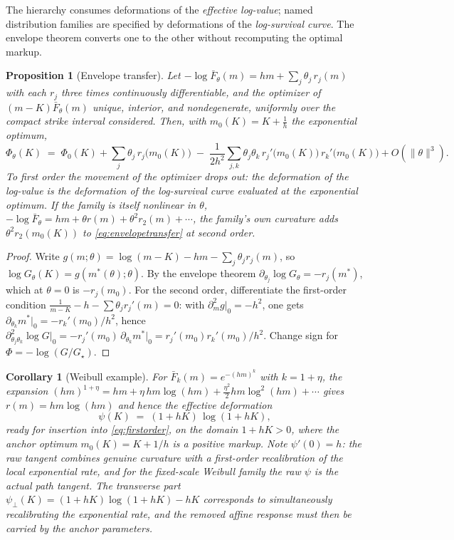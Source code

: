 \documentclass[11pt]{article}
\newtheorem{proposition}{Proposition}
\newtheorem{corollary}{Corollary}
\newcommand{\Fbar}{\bar F}
\begin{document}
The hierarchy consumes deformations of the \emph{effective log-value}; named distribution families are specified by deformations of the \emph{log-survival curve}. The envelope theorem converts one to the other without recomputing the optimal markup.

\begin{proposition}[Envelope transfer]\label{prop:envelope}
Let $-\log \Fbar_\theta(m) = hm + \sum_j \theta_j\, r_j(m)$ with each $r_j$ three times continuously differentiable, and the optimizer of $(m-K)\Fbar_\theta(m)$ unique, interior, and nondegenerate, uniformly over the compact strike interval considered. Then, with $m_0(K) = K + \tfrac1h$ the exponential optimum,
\begin{equation}
\Phi_\theta(K) \;=\; \Phi_0(K) + \sum_j \theta_j\, r_j\big(m_0(K)\big)
\;-\; \frac{1}{2h^2}\sum_{j,k}\theta_j\theta_k\, r_j'\big(m_0(K)\big)\, r_k'\big(m_0(K)\big) + O(\|\theta\|^3).
\label{eq:envelopetransfer}
\end{equation}
To first order the movement of the optimizer drops out: the deformation of the log-value is the deformation of the log-survival curve evaluated at the exponential optimum. If the family is itself nonlinear in $\theta$, $-\log\Fbar_\theta = hm + \theta r(m) + \theta^2 r_2(m) + \cdots$, the family's own curvature adds $\theta^2 r_2(m_0(K))$ to \eqref{eq:envelopetransfer} at second order.
\end{proposition}

\begin{proof}
Write $g(m;\theta) = \log(m-K) - hm - \sum_j\theta_j r_j(m)$, so $\log G_\theta(K) = g(m^\ast(\theta);\theta)$. By the envelope theorem $\partial_{\theta_j}\log G_\theta = -r_j(m^\ast)$, which at $\theta = 0$ is $-r_j(m_0)$. For the second order, differentiate the first-order condition $\tfrac{1}{m-K} - h - \sum\theta_j r_j'(m) = 0$: with $\partial^2_m g\big|_0 = -h^2$, one gets $\partial_{\theta_k} m^\ast\big|_0 = -r_k'(m_0)/h^2$, hence $\partial^2_{\theta_j\theta_k}\log G\big|_0 = -r_j'(m_0)\,\partial_{\theta_k}m^\ast\big|_0 = r_j'(m_0) r_k'(m_0)/h^2$. Change sign for $\Phi = -\log(G/G_\star)$.
\end{proof}

\begin{corollary}[Weibull example]\label{cor:weibull}
For $\Fbar_k(m) = e^{-(hm)^k}$ with $k = 1 + \eta$, the expansion $(hm)^{1+\eta} = hm + \eta\, hm\log(hm) + \tfrac{\eta^2}{2} hm \log^2(hm) + \cdots$ gives $r(m) = hm\log(hm)$ and hence the effective deformation
\[
\psi(K) \;=\; (1 + hK)\,\log(1 + hK),
\]
ready for insertion into \eqref{eq:firstorder}, on the domain $1 + hK > 0$, where the anchor optimum $m_0(K) = K + 1/h$ is a positive markup. Note $\psi'(0) = h$: the raw tangent combines genuine curvature with a first-order recalibration of the local exponential rate, and for the fixed-scale Weibull family the raw $\psi$ is the actual path tangent. The transverse part $\psi_\perp(K) = (1+hK)\log(1+hK) - hK$ corresponds to simultaneously recalibrating the exponential rate, and the removed affine response must then be carried by the anchor parameters.
\end{corollary}
\end{document}
